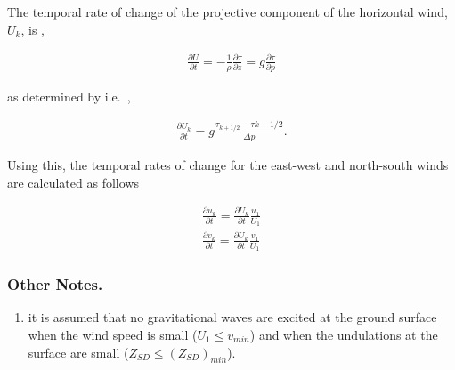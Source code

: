 The temporal rate of change of the projective component of the
horizontal wind, \(U_{k}\), is ,

\begin{eqnarray}
  \frac{\partial U}{\partial t} 
        = - \frac{1}{\rho} \frac{\partial \tau}{\partial z}
        = g  \frac{\partial \tau}{\partial p}
\end{eqnarray}

as determined by i.e.~,

\begin{eqnarray}
  \frac{\partial U_{k}}{\partial t} 
        =  g  \frac{\tau_{k+1/2} - \tau{k-1/2}}{\Delta p}.
\end{eqnarray}

Using this, the temporal rates of change for the east-west and
north-south winds are calculated as follows

\begin{eqnarray}
  \frac{\partial u_{k}}{\partial t}  = 
           \frac{\partial U_{k}}{\partial t} \frac{u_{1}}{U_{1}} \\
  \frac{\partial v_{k}}{\partial t}  = 
           \frac{\partial U_{k}}{\partial t} \frac{v_{1}}{U_{1}}
\end{eqnarray}

\hypertarget{other-notes.}{%
\subsubsection{Other Notes.}\label{other-notes.}}

\begin{enumerate}
\def\labelenumi{\arabic{enumi}.}
\tightlist
\item
  it is assumed that no gravitational waves are excited at the ground
  surface when the wind speed is small (\(U_{1} \le v_{min}\)) and when
  the undulations at the surface are small
  (\(Z_{SD} \le (Z_{SD})_{min}\)).
\end{enumerate}
